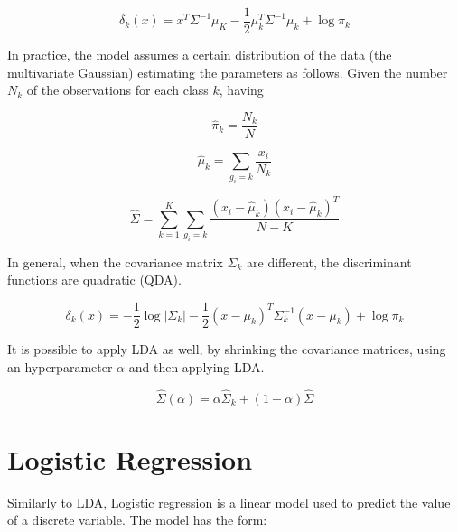 \begin{equation}
    \delta_k\left(x\right)=x^T\Sigma^{-1}\mu_K-\frac{1}{2}\mu_k^T\Sigma^{-1}\mu_k+\log{\pi_k}
    \label{eq_LDA3}
\end{equation}

In practice, the model assumes a certain distribution of the data (the multivariate Gaussian) estimating the parameters as follows. Given the number $N_k$ of the observations for each class $k$, having

\begin{equation}
    {\hat{\pi}}_k=\frac{N_k}{N}
    \label{eq_LDA4}
\end{equation}

\begin{equation}
    {\hat{\mu}}_k=\sum_{g_i=k}\frac{x_i}{N_k}
    \label{eq_LDA5}
\end{equation}

\begin{equation}
    \hat{\Sigma}=\sum_{k=1}^{K}\sum_{g_i=k}\frac{\left(x_i-{\hat{\mu}}_k\right)\left(x_i-{\hat{\mu}}_k\right)^T}{N-K}
    \label{eq_LDA6}
\end{equation}

In general, when the covariance matrix $\Sigma_k$ are different, the discriminant functions are quadratic (QDA).

\begin{equation}
    \delta_k\left(x\right)=-\frac{1}{2}\log{\left|\Sigma_k\right|-\frac{1}{2}}\left(x-\mu_k\right)^T\Sigma_k^{-1}\left(x-\mu_k\right)+\log{\pi_k}
    \label{eq_LDA7}
\end{equation}

It is possible to apply LDA as well, by shrinking the covariance matrices, using an hyperparameter $\alpha$ and then applying LDA.

\begin{equation}
    \hat{\Sigma}\left(\alpha\right)=\alpha{\hat{\Sigma}}_k+\left(1-\alpha\right)\hat{\Sigma}
    \label{eq_LDA8}
\end{equation}


\section{Logistic Regression} \label{secLogisticRegression}

Similarly to LDA, Logistic regression is a linear model used to predict the value of a discrete variable. The model has the form:

